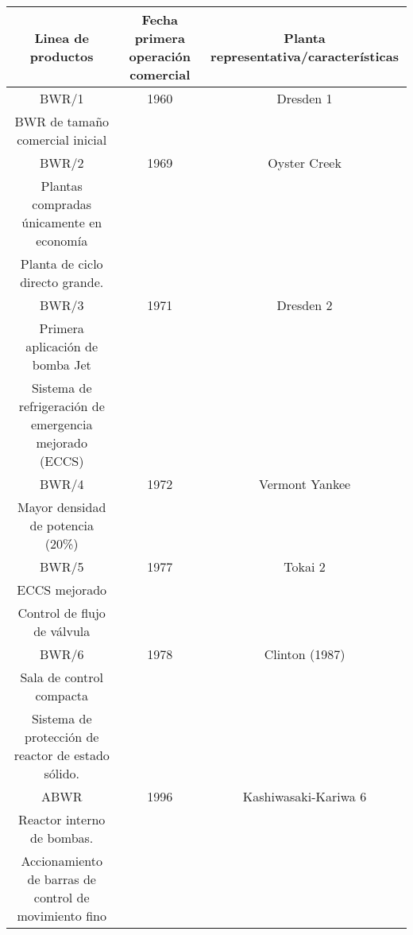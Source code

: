 \documentclass{standalone}
\begin{document}
\begin{table}[H]
\begin{tabular}{|c|c|c|}
\hline
\multicolumn{1}{|c|}{\textbf{Linea de productos}} & \multicolumn{1}{c|}{\textbf{Fecha primera operación comercial}} & \multicolumn{1}{c|}{\textbf{Planta representativa/características}} \\ \hline
BWR/1 & 1960 & Dresden 1\\ BWR de tamaño comercial inicial \\ \hline
BWR/2 & 1969 & Oyster Creek\\ Plantas compradas únicamente en economía\\ Planta de ciclo directo grande. \\ \hline
BWR/3 & 1971 & Dresden 2        \\ Primera aplicación de bomba Jet\\ Sistema de refrigeración de emergencia mejorado (ECCS) \\ \hline
BWR/4 & 1972 & Vermont Yankee\\ Mayor densidad de potencia (20\%) \\ \hline
BWR/5 & 1977 & Tokai 2\\ ECCS mejorado\\ Control de flujo de válvula \\ \hline
BWR/6 & 1978 & Clinton (1987)\\ Sala de control compacta\\ Sistema de protección de reactor de estado sólido. \\ \hline
ABWR & 1996 & Kashiwasaki-Kariwa 6\\ Reactor interno de bombas.\\ Accionamiento de barras de control de movimiento fino \\ \hline
\end{tabular}
\end{table}
\end{document}
